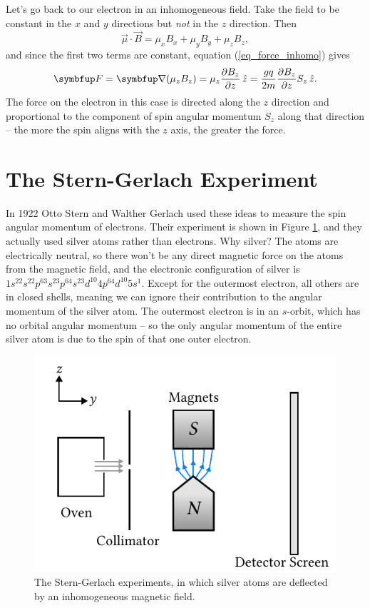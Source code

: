 Let's go back to our electron in an inhomogeneous field. Take the field to be constant in the $x$ and $y$ directions but \emph{not} in the $z$ direction.  Then
\[
\vec{\mu} \cdot \vec{B} = \mu_x B_x + \mu_y B_y + \mu_z B_z,
\]  
and since the first two terms are constant, equation (\ref{eq_force_inhomo}) gives
\begin{equation}
\vec{F} = \grad ( \mu_z B_z ) = \mu_z \dfdx{B_z}{z} \, \hat{z} = \frac{gq}{2m} \dfdx{B_z}{z} S_z \, \hat{z}.
\label{eq_force_spin}
\end{equation}
The force on the electron in this case is directed along the $z$ direction and proportional to the component of spin angular momentum $S_z$ along that direction -- the more the spin aligns with the $z$ axis, the greater the force.
%
%
%

\section{The Stern-Gerlach Experiment}

In 1922 Otto Stern and Walther Gerlach used these ideas to measure the spin angular momentum of electrons.  Their experiment is shown in Figure \ref{fig_stern_gerlach_exp}, and they actually used silver atoms rather than electrons.  Why silver?  The atoms are electrically neutral, so there won't be any direct magnetic force on the atoms from the magnetic field, and the electronic configuration of silver is $1s^22s^22p^63s^23p^64s^23d^{10}4p^64d^{10}5s^1$.  Except for the outermost electron, all others are in closed shells, meaning we can ignore their contribution to the angular momentum of the silver atom.  The outermost electron is in an $s$-orbit, which has no orbital angular momentum -- so the only angular momentum of the entire silver atom is due to the spin of that one outer electron.

\begin{figure}
\centering\includegraphics[width=0.6\linewidth]{Figures/Chapter 1/fig_stern_gerlach_exp.pdf}
\caption{The Stern-Gerlach experiments, in which silver atoms are deflected by an inhomogeneous magnetic field.}
\label{fig_stern_gerlach_exp}
\end{figure}

